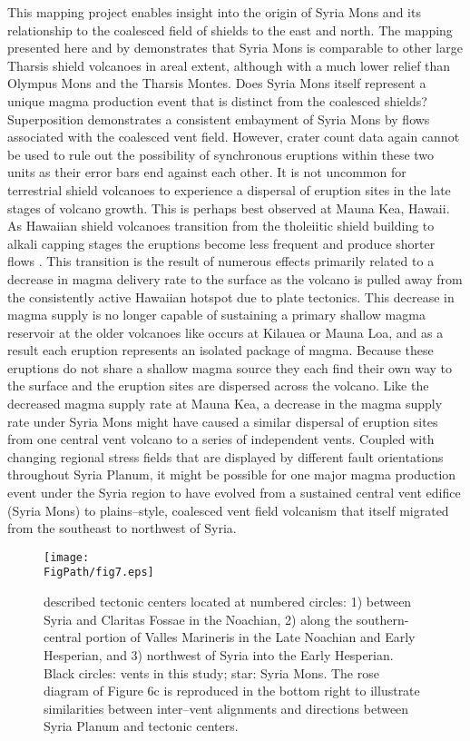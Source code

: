 This mapping project enables insight into the origin of Syria Mons and its relationship to the coalesced field of shields to the east and north.  The mapping presented here and by \citet{Baptista2008} demonstrates that Syria Mons is comparable to other large Tharsis shield volcanoes in areal extent, although with a much lower relief than Olympus Mons and the Tharsis Montes.  Does Syria Mons itself represent a unique magma production event that is distinct from the coalesced shields?  Superposition demonstrates a consistent embayment of Syria Mons by flows associated with the coalesced vent field.  However, crater count data again cannot be used to rule out the possibility of synchronous eruptions within these two units as their error bars end against each other. It is not uncommon for terrestrial shield volcanoes to experience a dispersal of eruption sites in the late stages of volcano growth.  This is perhaps best observed at Mauna Kea, Hawaii.  As Hawaiian shield volcanoes transition from the tholeiitic shield building to alkali capping stages the eruptions become less frequent and produce shorter flows \citep{Moore2007,Wolfe1996,Rowland2000,Bleacher2008}.  This transition is the result of numerous effects primarily related to a decrease in magma delivery rate to the surface as the volcano is pulled away from the consistently active Hawaiian hotspot due to plate tectonics.  This decrease in magma supply is no longer capable of sustaining a primary shallow magma reservoir at the older volcanoes like occurs at Kilauea or Mauna Loa, and as a result each eruption represents an isolated package of magma.  Because these eruptions do not share a shallow magma source they each find their own way to the surface and the eruption sites are dispersed across the volcano. Like the decreased magma supply rate at Mauna Kea, a decrease in the magma supply rate under Syria Mons might have caused a similar dispersal of eruption sites from one central vent volcano to a series of independent vents. Coupled with changing regional stress fields that are displayed by different fault orientations throughout Syria Planum, it might be possible for one major magma production event under the Syria region to have evolved from a sustained central vent edifice (Syria Mons) to plains--style, coalesced vent field volcanism that itself migrated from the southeast to northwest of Syria.  

\begin{figure}[ht]
\centering
\texttt{[image: \\FigPath/fig7.eps]}
\caption[Map of tectonic centers from \citet{Anderson2001}]{\citet{Anderson2001} described tectonic centers located at numbered circles: 1) between Syria and Claritas Fossae in the Noachian, 2) along the southern-central portion of Valles Marineris in the Late Noachian and Early Hesperian, and 3) northwest of Syria into the Early Hesperian. Black circles: vents in this study; star: Syria Mons. The rose diagram of Figure 6c is reproduced in the bottom right to illustrate similarities between inter--vent alignments and directions between Syria Planum and tectonic centers.}
\label{fig-andersoncenters}
\end{figure}

